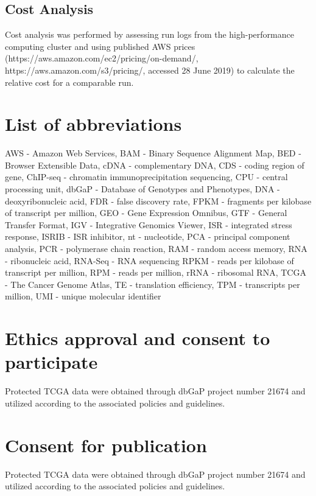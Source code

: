 \documentclass[10pt, oneside]{article}
\begin{document}
\subsection{Cost Analysis}
Cost analysis was performed by assessing run logs from the high-performance computing cluster and using published AWS prices (https://aws.amazon.com/ec2/pricing/on-demand/, https://aws.amazon.com/s3/pricing/, accessed 28 June 2019) to calculate the relative cost for a comparable run.

\section*{List of abbreviations}
AWS - Amazon Web Services,
BAM - Binary Sequence Alignment Map,
BED - Browser Extensible Data,
cDNA - complementary DNA,
CDS - coding region of gene,
ChIP-seq - chromatin immunoprecipitation sequencing,
CPU - central processing unit,
dbGaP - Database of Genotypes and Phenotypes,
DNA - deoxyribonucleic acid,
FDR - false discovery rate,
FPKM - fragments per kilobase of transcript per million,
GEO - Gene Expression Omnibus,
GTF - General Transfer Format,
IGV - Integrative Genomics Viewer,
ISR - integrated stress response,
ISRIB - ISR inhibitor,
nt - nucleotide,
PCA - principal component analysis,
PCR - polymerase chain reaction,
RAM - random access memory,
RNA - ribonucleic acid,
RNA-Seq - RNA sequencing
RPKM - reads per kilobase of transcript per million,
RPM - reads per million,
rRNA - ribosomal RNA,
TCGA - The Cancer Genome Atlas,
TE - translation efficiency,
TPM - transcripts per million,
UMI - unique molecular identifier

\section*{Ethics approval and consent to participate}
Protected TCGA data were obtained through dbGaP project number 21674 and utilized according to the associated policies and guidelines.

\section*{Consent for publication}
Protected TCGA data were obtained through dbGaP project number 21674 and utilized according to the associated policies and guidelines.
\end{document}
